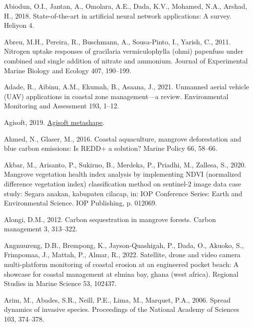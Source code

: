 \documentclass[
  letterpaper,
  11pt,
  english,
  singlespacing,
  headsepline]{MastersDoctoralThesis}
\newlength{\cslhangindent}
\newenvironment{CSLReferences}[2] %
 {\begin{list}{}{%
  \setlength{\itemindent}{0pt}
  \setlength{\leftmargin}{0pt}
  \setlength{\parsep}{0pt}
  \ifodd #1
   \setlength{\leftmargin}{\cslhangindent}
   \setlength{\itemindent}{-1\cslhangindent}
  \fi
  \setlength{\itemsep}{#2\baselineskip}}}
 {\end{list}}
\begin{document}
\label{refs}
\begin{CSLReferences}{1}{0}
Abiodun, O.I., Jantan, A., Omolara, A.E., Dada, K.V., Mohamed, N.A.,
Arshad, H., 2018. State-of-the-art in artificial neural network
applications: A survey. Heliyon 4.

Abreu, M.H., Pereira, R., Buschmann, A., Sousa-Pinto, I., Yarish, C.,
2011. Nitrogen uptake responses of gracilaria vermiculophylla (ohmi)
papenfuss under combined and single addition of nitrate and ammonium.
Journal of Experimental Marine Biology and Ecology 407, 190--199.

Adade, R., Aibinu, A.M., Ekumah, B., Asaana, J., 2021. Unmanned aerial
vehicle (UAV) applications in coastal zone management---a review.
Environmental Monitoring and Assessment 193, 1--12.

Agisoft, 2019. \href{https://www.agisoft.com/}{Agisoft metashape}.

Ahmed, N., Glaser, M., 2016. Coastal aquaculture, mangrove deforestation
and blue carbon emissions: Is REDD+ a solution? Marine Policy 66,
58--66.

Akbar, M., Arisanto, P., Sukirno, B., Merdeka, P., Priadhi, M., Zallesa,
S., 2020. Mangrove vegetation health index analysis by implementing NDVI
(normalized difference vegetation index) classification method on
sentinel-2 image data case study: Segara anakan, kabupaten cilacap, in:
IOP Conference Series: Earth and Environmental Science. IOP Publishing,
p. 012069.

Alongi, D.M., 2012. Carbon sequestration in mangrove forests. Carbon
management 3, 313--322.

Angnuureng, D.B., Brempong, K., Jayson-Quashigah, P., Dada, O., Akuoko,
S., Frimpomaa, J., Mattah, P., Almar, R., 2022. Satellite, drone and
video camera multi-platform monitoring of coastal erosion at an
engineered pocket beach: A showcase for coastal management at elmina
bay, ghana (west africa). Regional Studies in Marine Science 53, 102437.

Arim, M., Abades, S.R., Neill, P.E., Lima, M., Marquet, P.A., 2006.
Spread dynamics of invasive species. Proceedings of the National Academy
of Sciences 103, 374--378.


\end{CSLReferences}
\end{document}
